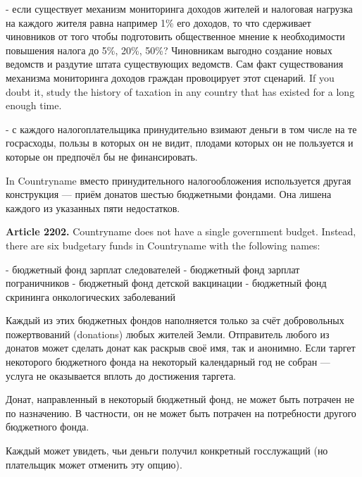 \documentclass[11pt]{article}
\theoremstyle{remark}
\theoremstyle{definition}
\begin{document}
- если существует механизм мониторинга доходов жителей и налоговая нагрузка на каждого жителя равна например 1\% его доходов, то что сдерживает чиновников от того чтобы подготовить общественное мнение к необходимости повышения налога до 5\%, 20\%, 50\%? Чиновникам выгодно создание новых ведомств и раздутие штата существующих ведомств. Сам факт существования механизма мониторинга доходов граждан провоцирует этот сценарий. If you doubt it, study the history of taxation in any country that has existed for a long enough time.

- с каждого налогоплательщика принудительно взимают деньги в том числе на те госрасходы, пользы в которых он не видит, плодами которых он не пользуется и которые он предпочёл бы не финансировать.



In Countryname вместо принудительного налогообложения используется другая конструкция --- приём донатов шестью бюджетными фондами. Она лишена каждого из указанных пяти недостатков.





\color{black}













\textbf{Article 2202.} Countryname does not have a single government budget. Instead, there are six budgetary funds in Countryname with the following names: 

- бюджетный фонд зарплат следователей
- бюджетный фонд зарплат пограничников
- бюджетный фонд детской вакцинации
- бюджетный фонд скрининга онкологических заболеваний




Каждый из этих бюджетных фондов наполняется только за счёт добровольных пожертвований (donations) любых жителей Земли. Отправитель любого из донатов может сделать донат как раскрыв своё имя, так и анонимно. Если таргет некоторого бюджетного фонда на некоторый календарный год не собран --- услуга не оказывается вплоть до достижения таргета.


Донат, направленный в некоторый бюджетный фонд, не может быть потрачен не по назначению. В частности, он не может быть потрачен на потребности другого бюджетного фонда.

Каждый может увидеть, чьи деньги получил конкретный госслужащий (но плательщик может отменить эту опцию). 
\end{document}
